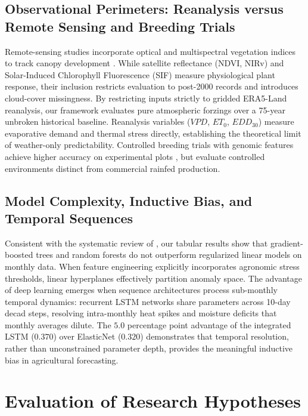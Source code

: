 \subsection{Observational Perimeters: Reanalysis versus Remote Sensing and Breeding Trials}
Remote-sensing studies incorporate optical and multispectral vegetation indices to track canopy development \citep{Xie2025, Yinetal2026}. While satellite reflectance (NDVI, NIRv) and Solar-Induced Chlorophyll Fluorescence (SIF) measure physiological plant response, their inclusion restricts evaluation to post-2000 records and introduces cloud-cover missingness. By restricting inputs strictly to gridded ERA5-Land reanalysis, our framework evaluates pure atmospheric forzings over a 75-year unbroken historical baseline. Reanalysis variables ($VPD$, $ET_0$, $EDD_{30}$) measure evaporative demand and thermal stress directly, establishing the theoretical limit of weather-only predictability. Controlled breeding trials with genomic features achieve higher accuracy on experimental plots \citep{Shooketal2021}, but evaluate controlled environments distinct from commercial rainfed production.

\subsection{Model Complexity, Inductive Bias, and Temporal Sequences}
Consistent with the systematic review of \citet{Sharmaetal2025}, our tabular results show that gradient-boosted trees and random forests do not outperform regularized linear models on monthly data. When feature engineering explicitly incorporates agronomic stress thresholds, linear hyperplanes effectively partition anomaly space. The advantage of deep learning emerges when sequence architectures process sub-monthly temporal dynamics: recurrent LSTM networks share parameters across 10-day decad steps, resolving intra-monthly heat spikes and moisture deficits that monthly averages dilute. The $5.0$ percentage point advantage of the integrated LSTM ($0.370$) over ElasticNet ($0.320$) demonstrates that temporal resolution, rather than unconstrained parameter depth, provides the meaningful inductive bias in agricultural forecasting.


\section{Evaluation of Research Hypotheses}
\label{sec:disc_hypotheses}

